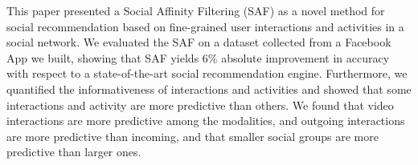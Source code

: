 
This paper presented a Social Affinity Filtering (SAF) as a novel method
for social recommendation based on fine-grained user interactions and
activities in a social network. We evaluated the SAF on a dataset collected 
from a Facebook App we built, showing that SAF yields 6\% absolute improvement
in accuracy with respect to a state-of-the-art social recommendation engine.
Furthermore, we quantified the informativeness of 
interactions and activities and showed that some interactions 
and activity are more predictive than others. We found that video interactions
 are more predictive among the modalities, and outgoing interactions 
are more predictive than incoming, and that smaller social groups are more predictive than
larger ones. 



